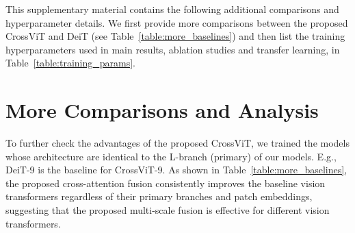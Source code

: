 \documentclass[10pt,twocolumn,letterpaper]{article}
\def\ours{CrossViT\xspace}
\newcommand{\myparagraphfirst}[1]{\vspace{0mm} \noindent {\textbf{#1}}}
\begin{document}
 

{\small


}
\clearpage
\appendix
\myparagraphfirst{Summary} This supplementary material contains the following additional comparisons and hyperparameter details.
We first provide more comparisons between the proposed \ours and DeiT (see Table~\ref{table:more_baselines}) and then list the training hyperparameters used in main results, ablation studies and transfer learning, in Table~\ref{table:training_params}. 


\section{More Comparisons and Analysis}



To further check the advantages of the proposed \ours, we trained the models whose architecture are identical to the L-branch (primary) of our models. E.g., DeiT-9 is the baseline for \ours-9. As shown in Table~\ref{table:more_baselines},
the proposed cross-attention fusion consistently improves the baseline vision transformers regardless of their primary branches and patch embeddings, suggesting that the proposed multi-scale fusion is effective for different vision transformers. 
\end{document}
